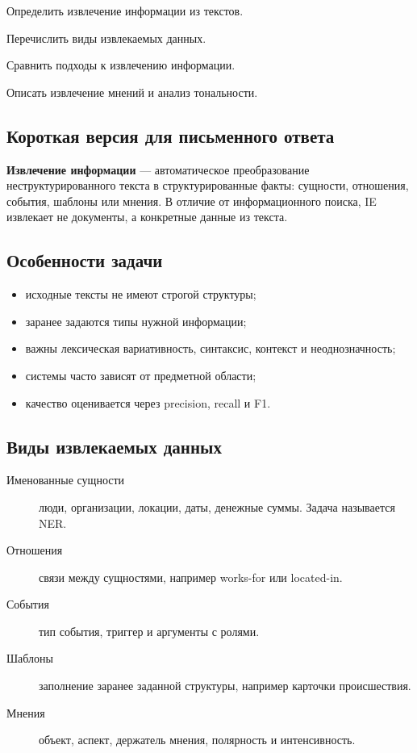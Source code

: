 
\begin{examplan}
    \item Определить извлечение информации из текстов.
    \item Перечислить виды извлекаемых данных.
    \item Сравнить подходы к извлечению информации.
    \item Описать извлечение мнений и анализ тональности.
\end{examplan}

\subsection*{Короткая версия для письменного ответа}

\textbf{Извлечение информации} --- автоматическое преобразование неструктурированного текста в структурированные факты: сущности, отношения, события, шаблоны или мнения. В отличие от информационного поиска, IE извлекает не документы, а конкретные данные из текста.

\subsection*{Особенности задачи}

\begin{itemize}
    \item исходные тексты не имеют строгой структуры;
    \item заранее задаются типы нужной информации;
    \item важны лексическая вариативность, синтаксис, контекст и неоднозначность;
    \item системы часто зависят от предметной области;
    \item качество оценивается через precision, recall и F1.
\end{itemize}

\subsection*{Виды извлекаемых данных}

\begin{description}
    \item[Именованные сущности] люди, организации, локации, даты, денежные суммы. Задача называется NER.
    \item[Отношения] связи между сущностями, например works-for или located-in.
    \item[События] тип события, триггер и аргументы с ролями.
    \item[Шаблоны] заполнение заранее заданной структуры, например карточки происшествия.
    \item[Мнения] объект, аспект, держатель мнения, полярность и интенсивность.
\end{description}

